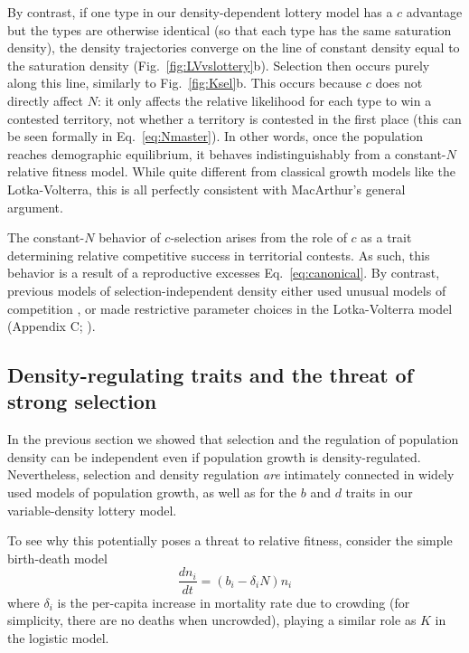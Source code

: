 \documentclass[12pt]{article}
\begin{document}
By contrast, if one type in our density-dependent lottery model has a $c$ advantage but the types are otherwise identical (so that each type has the same saturation density), the density trajectories converge on the line of constant density equal to the saturation density (Fig.~\ref{fig:LVvslottery}b). Selection then occurs purely along this line, similarly to Fig.~\ref{fig:Ksel}b. This occurs because $c$ does not directly affect $N$: it only affects the relative likelihood for each type to win a contested territory, not whether a territory is contested in the first place (this can be seen formally in Eq.~\eqref{eq:Nmaster}). In other words, once the population reaches demographic equilibrium, it behaves indistinguishably from a constant-$N$ relative fitness model. While quite different from classical growth models like the Lotka-Volterra, this is all perfectly consistent with MacArthur's general argument. 

The constant-$N$ behavior of $c$-selection arises from the role of $c$ as a trait determining relative competitive success in territorial contests. As such, this behavior is a result of a reproductive excesses Eq.~\eqref{eq:canonical}. By contrast, previous models of selection-independent density either used unusual models of competition \citep{kimura1969natural,nei1971fertility}, or made restrictive parameter choices in the Lotka-Volterra model (Appendix C; \citealt{smouse_1976,mallet_2012}). 

\subsection*{Density-regulating traits and the threat of strong selection}

In the previous section we showed that selection and the regulation of population density can be independent even if population growth is density-regulated. Nevertheless, selection and density regulation \textit{are} intimately connected in widely used models of population growth, as well as for the $b$ and $d$ traits in our variable-density lottery model.

To see why this potentially poses a threat to relative fitness, consider the simple birth-death model \cite[pp. 20]{kostitzin_1939} \citep{travis_2013} 
\begin{equation}
\frac{d n_i}{dt}=(b_i -\delta_iN) n_i \label{eq:simplebirthdeath}
\end{equation}
where $\delta_i$ is the per-capita increase in mortality rate due to crowding (for simplicity, there are no deaths when uncrowded), playing a similar role as $K$ in the logistic model. 
\end{document}
